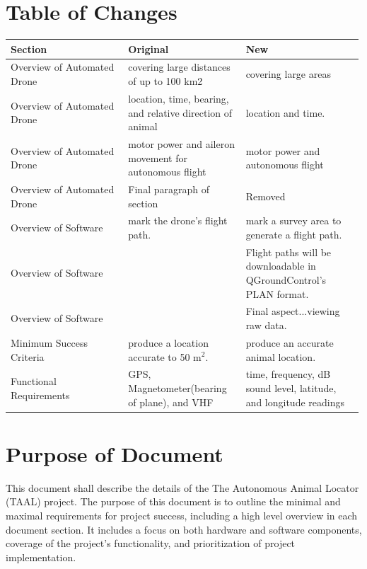 \documentclass[onecolumn, draftclsnofoot,10pt, compsoc]{IEEEtran}
\begin{document}
\section{Table of Changes}
\begin{center}
    \begin{tabular}{|p{0.33\linewidth}|p{0.33\linewidth}|p{0.33\linewidth}|}
    \hline
    Section & Original & New \\ %
        \hline
         Overview of Automated Drone & covering large distances of up to 100 km2 & covering large areas \\ 
         \hline
         Overview of Automated Drone & location, time, bearing, and relative direction of animal & location and time. \\ 
         \hline
         Overview of Automated Drone & motor power and aileron movement for autonomous flight & motor power and autonomous flight \\ 
         \hline
         Overview of Automated Drone & Final paragraph of section & Removed \\
         \hline
         Overview of Software & mark the drone’s flight path. & mark a survey area to generate a flight path. \\
         \hline
         Overview of Software &  & Flight paths will be downloadable in QGroundControl's PLAN format. \\
         \hline
         Overview of Software &  & Final aspect...viewing raw data. \\
         \hline
         Minimum Success Criteria & produce a location accurate to 50 m$^2$. & produce an accurate animal location. \\
         \hline
         Functional Requirements & GPS, Magnetometer(bearing of plane), and VHF & time, frequency, dB sound level, latitude, and longitude readings \\
         \hline
    \end{tabular}
\end{center}
\clearpage

\section{Purpose of Document}
This document shall describe the details of the The Autonomous Animal Locator (TAAL) project. The purpose of this document is to outline the minimal and maximal requirements for project success, including a high level overview in each document section. It includes a focus on both hardware and software components, coverage of the project’s functionality, and prioritization of project implementation.
\end{document}
